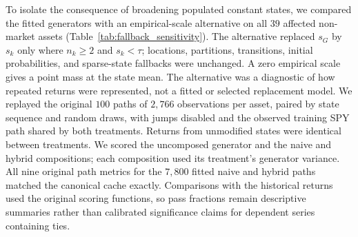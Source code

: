 \begin{table}[H]
 \centering
 \caption{\textbf{Fallback emissions in the full-return training fits.}
 Each listed asset had one populated constant-return state containing
 $n_{\rm c}$ observations. The columns $n_0$ and $n_1$ count empty
 and singleton states; the other $385$ full-return models required
 no fallback. Fallback mass is $100\sum_{k\in\mathcal F}\bar\pi_k$,
 where $\mathcal F$ contains all fallback states for that ticker.
 For populated constant states, the fitted location remained the
 state mean while the scale used the asset's full training standard
 deviation. Empty and singleton states used both full-series
 moments. $\Delta V$ is the percentage change in stationary mixture
 variance when only the populated constant-state scales are replaced
 by their empirical values, with all other parameters fixed.
 These are changes to the uncomposed generator, not variance errors
 from composition. All fits used $N=100$ and $\nu=5$.}
 \label{tab:fallback_assets}
 \footnotesize
 \setlength{\tabcolsep}{5pt}
 
\end{table}

To isolate the consequence of broadening populated constant states,
we compared the fitted generators with an empirical-scale alternative
on all $39$ affected non-market assets
(Table~\ref{tab:fallback_sensitivity}). The alternative replaced
$s_G$ by $s_k$ only where $n_k\ge2$ and $s_k<\tau$; locations,
partitions, transitions, initial probabilities, and sparse-state
fallbacks were unchanged. A zero empirical scale gives a point mass
at the state mean. The alternative was a diagnostic of how repeated
returns were represented, not a fitted or selected replacement model.
We replayed the original $100$ paths of $2{,}766$ observations per
asset, paired by state sequence and random draws, with jumps disabled
and the observed training SPY path shared by both treatments. Returns
from unmodified states were identical between treatments. We scored
the uncomposed generator and the naive and hybrid compositions;
each composition used its treatment's generator variance. All nine
original path metrics for the $7{,}800$ fitted naive and hybrid paths
matched the canonical cache exactly. Comparisons with the historical
returns used the original scoring functions, so pass fractions remain
descriptive summaries rather than calibrated significance claims for
dependent series containing ties.

